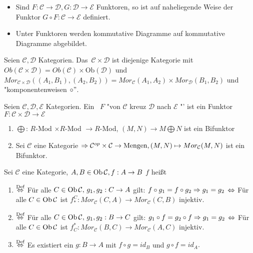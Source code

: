 \begin{anm}
	\begin{itemize}
		\item Sind $F: \mathcal{C} \to \mathcal{D}, G: \mathcal{D} \to \mathcal{E} $ Funktoren, so ist auf naheliegende Weise der Funktor $G \circ F : \mathcal{C} \to \mathcal{E}$ definiert.
		\item Unter Funktoren werden kommutative Diagramme auf kommutative Diagramme abgebildet.
	\end{itemize}
\end{anm}
\begin{df}\label{4.8}
	Seien $\mathcal{C},\mathcal{D} $ Kategorien. Das  \,$\mathcal{C} \times \mathcal{D} $ ist diejenige Kategorie mit $ Ob(\mathcal{C} \times \mathcal{D}) = Ob(\mathcal{C}) \times \text{Ob}(\mathcal{D}) $ und $ Mor_{\mathcal{C} \times \mathcal{D}}((A_1,B_1),(A_2,B_2)) = Mor_{\mathcal{C}}(A_1,A_2) \times Mor_{\mathcal{D}}(B_1,B_2)$ und "komponentenweisen $\circ"$.
\end{df}
\begin{df}\label{4.9}
	Seien $\mathcal{C},\mathcal{D}, \mathcal{E}$ Kategorien. Ein  \ $F$ "von $\mathcal{C}$ kreuz $\mathcal{D} $ nach $\mathcal{E}$ "' ist ein Funktor $F: \mathcal{C} \times \mathcal{D} \to \mathcal{E}$
\end{df}
\begin{bsp}
	\begin{enumerate}  [label= \alph*)]
		\item $\bigoplus$: $R$-Mod $\times R$-Mod $\to R$-Mod, $(M,N) \to M \bigoplus N $ ist ein Bifunktor
		\item Sei $\mathcal{C} $ eine Kategorie $\Rightarrow \mathcal{C}^{op} \times \mathcal{C} \to \text{Mengen}, (M,N) \mapsto  Mor_{\mathcal{C}}(M,N) $ ist ein Bifunktor.
	\end{enumerate}
\end{bsp}
\begin{df}\label{4.11}
	Sei $\mathcal{C}$ eine Kategorie, $ A,B \in \text{Ob}\,\mathcal{C}, f: A \to B $ $f$ heißt
	\begin{enumerate}
		\item[]  $\overset{\text{Def}}{\Leftrightarrow}$ Für alle $C \in \text{Ob}\,\mathcal{C},\, g_1,g_2: C \to A $ gilt: $f \circ g_1 = f \circ g_2 \Rightarrow g_1 = g_2$ $\Leftrightarrow$ Für alle $C \in \text{Ob}\,\mathcal{C}$ ist $f_{\ast}^{C}: Mor_{\mathcal{C}}(C,A) \to Mor_{\mathcal{C}}(C,B)$ injektiv.
		\item[]  $\overset{\text{Def}}{\Leftrightarrow}$ Für alle $C \in \text{Ob}\,\mathcal{C}, \,g_1,g_2: B \to C $ gilt: $g_1 \circ f = g_2 \circ f \Rightarrow g_1 = g_2$ $\Leftrightarrow$ Für alle $C \in \text{Ob}\,\mathcal{C}$ ist $f_{C}^{\ast}: Mor_{\mathcal{C}}(B,C) \to Mor_{\mathcal{C}}(A,C)$ injektiv.
		\item[]  $\overset{\text{Def}}{\Leftrightarrow}$ Es existiert ein $g:B \to A $ mit $ f\circ g = id_B $ und $ g \circ f = id_A.$
	\end{enumerate}
\end{df}
